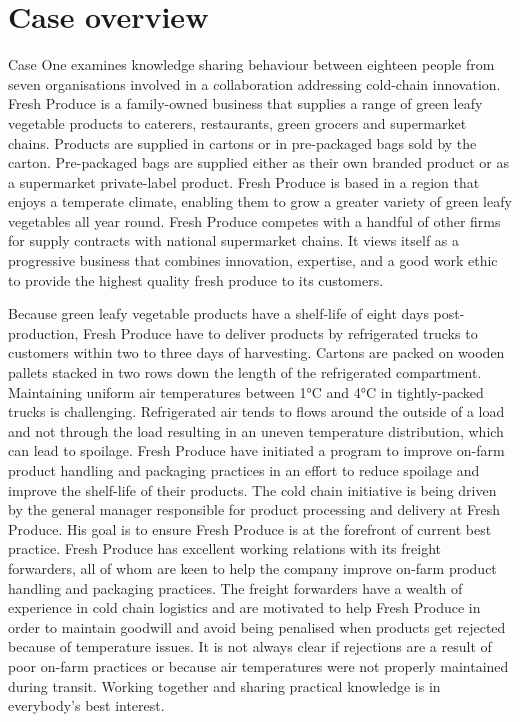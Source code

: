 
\section{Case overview}

Case One examines knowledge sharing behaviour between eighteen people from seven organisations involved in a collaboration addressing cold-chain innovation. Fresh Produce is a family-owned business that supplies a range of green leafy vegetable products to caterers, restaurants, green grocers and supermarket chains. Products are supplied in cartons or in pre-packaged bags sold by the carton. Pre-packaged bags are supplied either as their own branded product or as a supermarket private-label product. Fresh Produce is based in a region that enjoys a temperate climate, enabling them to grow a greater variety of green leafy vegetables all year round. Fresh Produce competes with a handful of other firms for supply contracts with national supermarket chains. It views itself as a progressive business that combines innovation, expertise, and a good work ethic to provide the highest quality fresh produce to its customers.\medskip

Because green leafy vegetable products have a shelf-life of eight days post-production, Fresh Produce have to deliver products by refrigerated trucks to customers within two to three days of harvesting. Cartons are packed on wooden pallets stacked in two rows down the length of the refrigerated compartment. Maintaining uniform air temperatures between 1\si{\degree}C and 4\si{\degree}C in tightly-packed trucks is challenging. Refrigerated air tends to flows around the outside of a load and not through the load resulting in an uneven temperature distribution, which can lead to spoilage. Fresh Produce have initiated a program to improve on-farm product handling and packaging practices in an effort to reduce spoilage and improve the shelf-life of their products. The cold chain initiative is being driven by the general manager responsible for product processing and delivery at Fresh Produce. His goal is to ensure Fresh Produce is at the forefront of current best practice. Fresh Produce has excellent working relations with its freight forwarders, all of whom are keen to help the company improve on-farm product handling and packaging practices. The freight forwarders have a wealth of experience in cold chain logistics and are motivated to help Fresh Produce in order to maintain goodwill and avoid being penalised when products get rejected because of temperature issues. It is not always clear if rejections are a result of poor on-farm practices or because air temperatures were not properly maintained during transit. Working together and sharing practical knowledge is in everybody's best interest.\medskip

